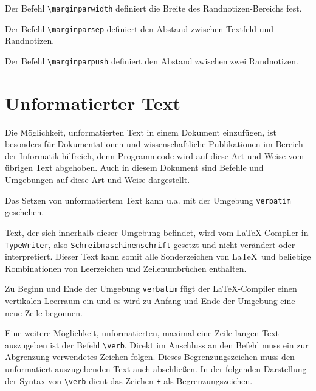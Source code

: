 Der Befehl \verb!\marginparwidth! definiert die Breite des Randnotizen-Bereichs fest.


Der Befehl \verb!\marginparsep! definiert den Abstand zwischen Textfeld und Randnotizen.


Der Befehl \verb!\marginparpush! definiert den Abstand zwischen zwei Randnotizen.


\section{Unformatierter Text}

Die Möglichkeit, unformatierten Text in einem Dokument einzufügen, ist 
besonders für Dokumentationen und wissenschaftliche 
Publikationen im Bereich der Informatik hilfreich, denn
Programmcode wird auf diese Art und Weise 
vom übrigen Text abgehoben.
Auch in diesem Dokument sind Befehle und Umgebungen auf diese Art und Weise dargestellt.

Das Setzen von unformatiertem Text kann u.a. mit der Umgebung \verb!verbatim! 
geschehen. 


Text, der sich innerhalb dieser Umgebung befindet, wird vom \LaTeX-Compiler in \verb!TypeWriter!, also \verb!Schreibmaschinenschrift! gesetzt und nicht verändert oder interpretiert.
Dieser Text kann somit alle Sonderzeichen von \LaTeX\ 
und beliebige Kombinationen von Leerzeichen und Zeilenumbrüchen enthalten. 

Zu Beginn und Ende der Umgebung \verb!verbatim! fügt der \LaTeX-Compiler einen
vertikalen Leerraum ein und es wird zu
Anfang und Ende der Umgebung eine neue Zeile begonnen.

Eine weitere Möglichkeit, unformatierten,
maximal eine Zeile langen Text auszugeben ist der Befehl \verb!\verb!.
Direkt im Anschluss an den Befehl muss ein zur Abgrenzung verwendetes Zeichen folgen.
Dieses Begrenzungszeichen muss den unformatiert auszugebenden Text auch abschließen. 
In der folgenden Darstellung der Syntax von \verb!\verb! dient das Zeichen \verb|+| als Begrenzungszeichen.

